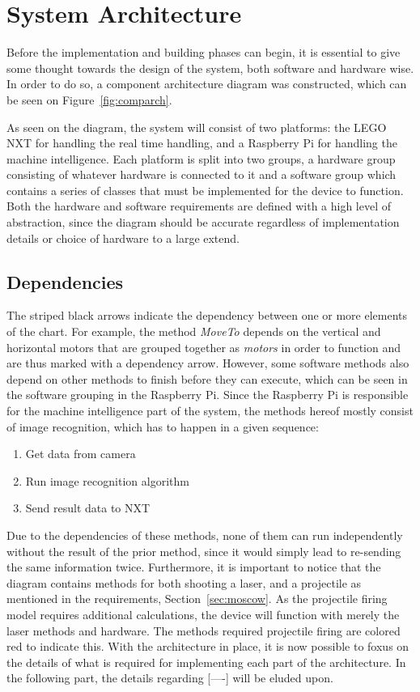 \section{System Architecture}
Before the implementation and building phases can begin, it is essential to give some thought towards the design of the system, both software and hardware wise.
In order to do so, a component architecture diagram was constructed, which can be seen on Figure~\ref{fig:comparch}.

As seen on the diagram, the system will consist of two platforms: the LEGO NXT for handling the real time handling, and a Raspberry Pi for handling the machine intelligence.
Each platform is split into two groups, a hardware group consisting of whatever hardware is connected to it and a software group which contains a series of classes that must be implemented for the device to function.
Both the hardware and software requirements are defined with a high level of abstraction, since the diagram should be accurate regardless of implementation details or choice of hardware to a large extend.
 
\subsection*{Dependencies}
The striped black arrows indicate the dependency between one or more elements of the chart. 
For example, the method \textit{MoveTo} depends on the vertical and horizontal motors that are grouped together as \textit{motors} in order to function and are thus marked with a dependency arrow.
However, some software methods also depend on other methods to finish before they can execute, which can be seen in the software grouping in the Raspberry Pi.
Since the Raspberry Pi is responsible for the machine intelligence part of the system, the methods hereof mostly consist of image recognition, which has to happen in a given sequence:
\begin{enumerate}
\item Get data from camera
\item Run image recognition algorithm
\item Send result data to NXT
\end{enumerate}

Due to the dependencies of these methods, none of them can run independently without the result of the prior method, since it would simply lead to re-sending the same information twice.
Furthermore, it is important to notice that the diagram contains methods for both shooting a laser, and a projectile as mentioned in the requirements, Section~\ref{sec:moscow}.
As the projectile firing model requires additional calculations, the device will function with merely the laser methods and hardware. 
The methods required projectile firing are colored red to indicate this.
With the architecture in place, it is now possible to foxus on the details of what is required for implementing each part of the architecture.
In the following part, the details regarding [----] will be eluded upon.
